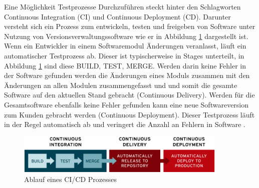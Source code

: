 Eine Möglichkeit Testprozesse Durchzuführen steckt hinter den Schlagworten Continuous Integration (CI) und Continuous Deployment (CD). Darunter versteht sich ein Prozess zum entwickeln, testen und freigeben von Software unter Nutzung von Versionsverwaltungssoftware wie er in Abbildung \ref{fig:ci-cd-flow-desktop} dargestellt ist. Wenn ein Entwickler in einem Softwaremodul Änderungen veranlasst, läuft ein automatischer Testprozess ab. Dieser ist typischerweise in Stages unterteilt, in Abbildung \ref{fig:ci-cd-flow-desktop} sind diese BUILD, TEST, MERGE. Werden darin keine Fehler in der Software gefunden werden die Änderungen eines Moduls zusammen mit den Änderungen an allen Modulen zusammengefasst und und somit die gesamte Software auf den aktuellen Stand gebracht (Continuous Delivery). Werden für die Gesamtsoftware ebenfalls keine Fehler gefunden kann eine neue Softwareversion zum Kunden gebracht werden (Continuous Deployment). Dieser Testprozess läuft in der Regel automatisch ab und veringert die Anzahl an Fehlern in Software \cite{redhat2024}.
\begin{figure}
    \centering
    \includegraphics[width=0.9\textwidth]{figures/2_Grundlagen/ci-cd-flow-desktop.png}
    \caption{Ablauf eines CI/CD Prozesses \cite{redhat2024}}
    \label{fig:ci-cd-flow-desktop}
\end{figure}